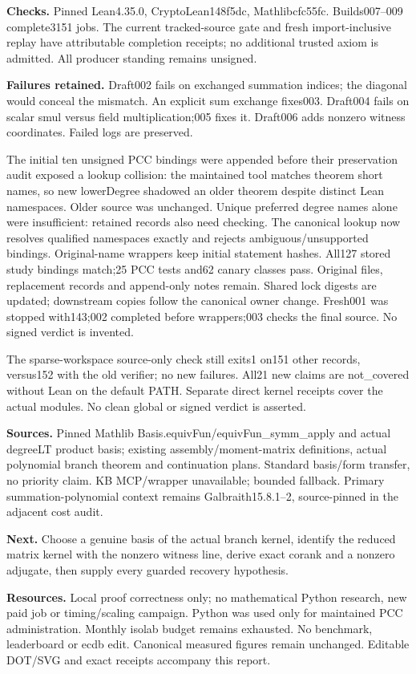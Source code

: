 \documentclass[11pt]{article}
\begin{document}
\textbf{Checks.} Pinned Lean4.35.0, CryptoLean148f5dc, Mathlibcfc55fc.
Builds007--009 complete3151 jobs. The current tracked-source gate and fresh
import-inclusive replay have attributable completion receipts; no additional
trusted axiom is admitted. All producer standing remains unsigned.

\textbf{Failures retained.} Draft002 fails on exchanged summation indices;
the diagonal would conceal the mismatch. An explicit sum exchange fixes003.
Draft004 fails on scalar smul versus field multiplication;005 fixes it.
Draft006 adds nonzero witness coordinates. Failed logs are preserved.

The initial ten unsigned PCC bindings were appended before their preservation
audit exposed a lookup collision: the maintained tool matches theorem short
names, so new lowerDegree shadowed an older theorem despite distinct Lean
namespaces. Older source was unchanged. Unique preferred degree names alone
were insufficient: retained records also need checking. The canonical lookup
now resolves qualified namespaces exactly and rejects ambiguous/unsupported
bindings. Original-name wrappers keep initial statement hashes. All127 stored
study bindings match;25 PCC tests and62 canary classes pass. Original files,
replacement records and append-only notes remain. Shared lock digests are
updated; downstream copies follow the canonical owner change. Fresh001 was
stopped with143;002 completed before wrappers;003 checks the final source.
No signed verdict is invented.

The sparse-workspace source-only check still exits1 on151 other records,
versus152 with the old verifier; no new failures. All21 new claims are
not\_covered without Lean on the default PATH. Separate direct kernel receipts
cover the actual modules. No clean global or signed verdict is asserted.

\textbf{Sources.} Pinned Mathlib Basis.equivFun/equivFun\_symm\_apply and
actual degreeLT product basis; existing assembly/moment-matrix definitions,
actual polynomial branch theorem and continuation plans. Standard basis/form
transfer, no priority claim. KB MCP/wrapper unavailable; bounded fallback.
Primary summation-polynomial context remains Galbraith15.8.1--2, source-pinned
in the adjacent cost audit.

\textbf{Next.} Choose a genuine basis of the actual branch kernel, identify
the reduced matrix kernel with the nonzero witness line, derive exact corank
and a nonzero adjugate, then supply every guarded recovery hypothesis.

\textbf{Resources.} Local proof correctness only; no mathematical Python
research, new paid job or timing/scaling campaign. Python was used only for
maintained PCC administration. Monthly isolab budget remains exhausted.
No benchmark, leaderboard or ecdb edit. Canonical measured figures remain
unchanged. Editable DOT/SVG and exact receipts accompany this report.
\end{document}
